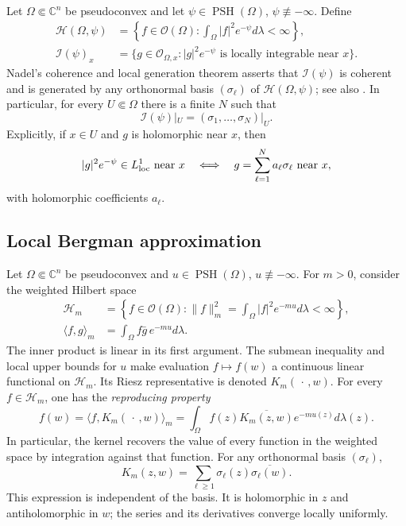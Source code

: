 \documentclass[reqno]{amsart}
\numberwithin{equation}{section}
\theoremstyle{definition}
\begin{document}
Let $\Omega\Subset\mathbb C^n$ be pseudoconvex and let
$\psi\in\operatorname{PSH}(\Omega)$, $\psi\not\equiv-\infty$.
Define
\[
\begin{aligned}
\mathscr H(\Omega,\psi)
 &=\left\{f\in\mathcal O(\Omega):
        \int_\Omega|f|^2e^{-\psi}d\lambda<\infty\right\},\\
\mathcal I(\psi)_x
 &=\{g\in\mathcal O_{\Omega,x}:
             |g|^2e^{-\psi}\text{ is locally integrable near }x\}.
\end{aligned}
\]
Nadel's coherence and local generation theorem \cite{Nadel}
asserts that $\mathcal I(\psi)$ is coherent and is generated by
any orthonormal basis $(\sigma_\ell)$ of
$\mathscr H(\Omega,\psi)$; see also \cite[Proposition~5.7 and its proof]{D00}. In particular, for every
$U\Subset\Omega$ there is a finite $N$ such that
\begin{equation}\label{eq:ideal-generators}
\mathcal I(\psi)|_U=(\sigma_1,\ldots,\sigma_N)|_U.
\end{equation}
Explicitly, if $x\in U$ and $g$ is holomorphic near $x$,
then
\[
|g|^2e^{-\psi}\in L^1_{\rm loc}\text{ near }x
\quad\Longleftrightarrow\quad
g=\sum_{\ell=1}^N a_\ell\sigma_\ell
\text{ near }x,
\]
with holomorphic coefficients $a_\ell$. 

\subsection{Local Bergman approximation}

Let $\Omega\Subset\mathbb C^n$ be pseudoconvex and
$u\in\operatorname{PSH}(\Omega)$, $u\not\equiv-\infty$.
For $m>0$, consider the weighted Hilbert space
\[
\begin{aligned}
\mathscr H_m
&=\left\{f\in\mathcal O(\Omega):
 \|f\|_m^2=\int_\Omega|f|^2e^{-mu}d\lambda<\infty\right\},
\\
\langle f,g\rangle_m&=\int_\Omega f\bar g\,e^{-mu}d\lambda.
\end{aligned}
\]
The inner product is linear in its first argument.
The submean inequality and local upper bounds for $u$ make
evaluation $f\mapsto f(w)$ a continuous linear functional on
$\mathscr H_m$. Its Riesz representative is denoted
$K_m(\,\cdot\,,w)$. For every $f\in\mathscr H_m$, one has the 
\emph{reproducing property}
\[
f(w)=\langle f,K_m(\,\cdot\,,w)\rangle_m
=\int_\Omega f(z)\overline{K_m(z,w)}e^{-mu(z)}d\lambda(z).
\]
In particular, the kernel recovers the value of every function
in the weighted space by integration against that function.
For any orthonormal basis $(\sigma_\ell)$,
\[
K_m(z,w)=\sum_{\ell\ge1}\sigma_\ell(z)\overline{\sigma_\ell(w)}.
\]
This expression is independent of the basis. It is holomorphic
in $z$ and antiholomorphic in $w$; the series and its
derivatives converge locally uniformly.
\end{document}
